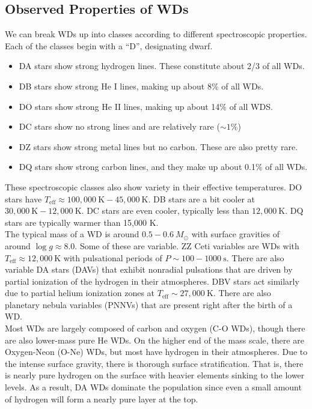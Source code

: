 \documentclass[10pt]{article}
\numberwithin{equation}{section}
\newcommand{\n}{\noindent}
\begin{document}
	\subsection{Observed Properties of WDs} %
	\label{sub:observed_properties_of_wds}
	We can break WDs up into classes according to different spectroscopic properties. Each of the classes begin with a ``D'', designating dwarf.
	\begin{itemize}
		\item DA stars show strong hydrogen lines. These constitute about 2/3 of all WDs.
		\item DB stars show strong He I lines, making up about 8\% of all WDs.
		\item DO stars show strong He II lines, making up about 14\% of all WDS.
		\item DC stars show no strong lines and are relatively rare ($\sim 1\%$)
		\item DZ stars show strong metal lines but no carbon. These are also pretty rare.
		\item DQ stars show strong carbon lines, and they make up about 0.1\% of all WDs.
	\end{itemize}
	These spectroscopic classes also show variety in their effective temperatures. DO stars have $T_{\mathrm{eff}}\approx 100,000\ \mathrm{K} - 45,000\ \mathrm{K}$. DB stars are a bit cooler at $30,000\ \mathrm{K} - 12,000\ \mathrm{K}$. DC stars are even cooler, typically less than $12,000\ \mathrm{K}$. DQ stars are typically warmer than 15,000 K.\\
	
	\n The typical mass of a WD is around $0.5-0.6\ M_\odot$ with surface gravities of around $\log g \approx 8.0$. Some of these are variable. ZZ Ceti variables are WDs with $T_{\mathrm{eff}}\approx 12,000\ \mathrm{K}$ with pulsational periods of $P\sim 100 - 1000\ \mathrm{s}$. There are also variable DA stars (DAVs) that exhibit nonradial pulsations that are driven by partial ionization of the hydrogen in their atmospheres. DBV stars act similarly due to partial helium ionization zones at $T_{\mathrm{eff}}\sim 27,000\ \mathrm{K}$. There are also planetary nebula variables (PNNVs) that are present right after the birth of a WD.\\
	
	\n Most WDs are largely composed of carbon and oxygen (C-O WDs), though there are also lower-mass pure He WDs. On the higher end of the mass scale, there are Oxygen-Neon (O-Ne) WDs, but most have hydrogen in their atmospheres. Due to the intense surface gravity, there is thorough surface stratification. That is, there is nearly pure hydrogen on the surface with heavier elements sinking to the lower levels. As a result, DA WDs dominate the population since even a small amount of hydrogen will form a nearly pure layer at the top.
\end{document}
